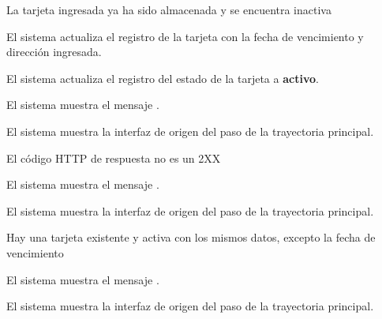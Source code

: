 {  \begin{trayectoriaAlternativa}
    {La tarjeta ingresada ya ha sido almacenada y se encuentra inactiva}

    \item El sistema actualiza el registro de la tarjeta con la fecha de
      vencimiento y dirección ingresada.

    \item El sistema actualiza el registro del estado de la tarjeta a
      \textbf{activo}.

    \item El sistema muestra el mensaje
      .

    \item El sistema muestra la interfaz de origen del paso
       de la trayectoria principal.

  \end{trayectoriaAlternativa}


  \begin{trayectoriaAlternativa}
    {El código HTTP de respuesta no es un 2XX}

    \item El sistema muestra el mensaje
      .

    \item El sistema muestra la interfaz de origen del paso
       de la trayectoria principal.

  \end{trayectoriaAlternativa}


  \begin{trayectoriaAlternativa}
    {Hay una tarjeta existente y activa con los mismos datos, excepto la fecha
    de vencimiento}

    \item El sistema muestra el mensaje
      .

    \item El sistema muestra la interfaz de origen del paso
       de la trayectoria principal.

  \end{trayectoriaAlternativa}
}
